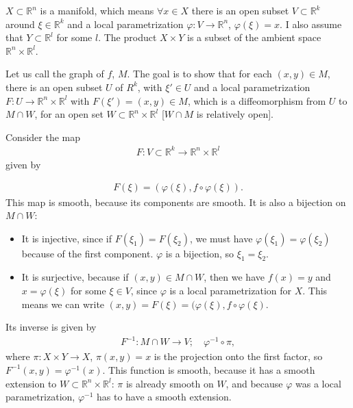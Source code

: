 \begin{solution}[9.1]
$X\subset \mathbb{R}^n$ is a manifold, which means $\forall x\in X$ there is an open subset $V\subset \mathbb{R}^k$ around $\xi\in \mathbb{R}^k$ and a local parametrization $\varphi : V \to \mathbb{R}^n$, $\varphi(\xi) = x$. I also assume that $Y\subset \mathbb{R}^l$ for some $l$. The product $X\times Y$ is a subset of the ambient space $\mathbb{R}^n\times \mathbb{R}^l$.

Let us call the graph of $f$, $M$. The goal is to show that for each $(x,y)\in M$, there is an open subset $U$ of $R^k$, with $\xi'\in U$ and a local parametrization $F:U\to \mathbb{R}^n\times \mathbb{R}^l$ with $F(\xi') = (x,y)\in M$, which is a diffeomorphism from $U$ to  $M\cap W$, for an open set $W\subset \mathbb{R}^n\times \mathbb{R}^l$ [$W\cap M$ is relatively open].

Consider the map 
\begin{align}
F:V\subset \mathbb{R}^k \to \mathbb{R}^n\times \mathbb{R}^l
\end{align}
given by

\begin{align}
F(\xi) = (\varphi(\xi), f\circ \varphi (\xi)).
\end{align}
This map is smooth, because its components are smooth. It is also a bijection on  $M\cap W$:
\begin{itemize}
    \item It is injective, since if $F(\xi_1) = F(\xi_2)$, we must have $\varphi(\xi_1)=\varphi(\xi_2)$ because of the first component. $\varphi$ is a bijection, so $\xi_1 = \xi_2$. 
    \item It is surjective, because if $(x,y)\in M\cap W$, then we have $f(x)=y$ and $x=\varphi(\xi)$ for some $\xi \in V$, since $\varphi$ is a local parametrization for $X$. This means we can write $(x,y) = F(\xi) = (\varphi(\xi), f\circ \varphi(\xi)$.
\end{itemize}

Its inverse is given by 
\begin{align}
F^{-1} : M\cap W \to V;\quad \varphi^{-1}\circ \pi,
\end{align}
where $\pi:X\times Y \to X$, $\pi(x,y) = x$ is the projection onto the first factor, so
$F^{-1}(x,y) = \varphi^{-1}(x)$.
This function is smooth, because it has a smooth extension to $W\subset \mathbb{R}^n\times \mathbb{R}^l$: $\pi$ is already smooth on $W$, and because $\varphi$ was a local parametrization, $\varphi^{-1}$ has to have a smooth extension. 


\end{solution}
